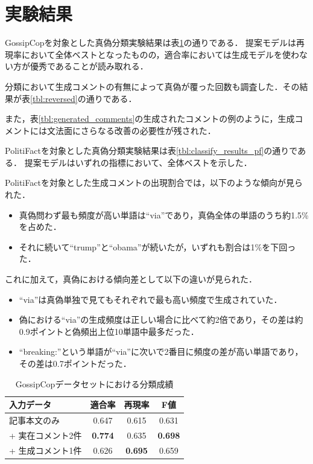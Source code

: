 \section{実験結果}
\label{sec:result}
GossipCopを対象とした真偽分類実験結果は表\ref{tbl:classify_results}の通りである．
提案モデルは再現率において全体ベストとなったものの，適合率においては生成モデルを使わない方が優秀であることが読み取れる．

分類において生成コメントの有無によって真偽が覆った回数も調査した．その結果が表\ref{tbl:reversed}の通りである．

また，表\ref{tbl:generated_comments}の生成されたコメントの例のように，生成コメントには文法面にさらなる改善の必要性が残された．

PolitiFactを対象とした真偽分類実験結果は表\ref{tbl:classify_results_pf}の通りである．
提案モデルはいずれの指標において、全体ベストを示した．

PolitiFactを対象とした生成コメントの出現割合では，以下のような傾向が見られた．
\begin{itemize}
    \item 真偽問わず最も頻度が高い単語は``via''であり，真偽全体の単語のうち約1.5\%を占めた．
    \item それに続いて``trump''と``obama''が続いたが，いずれも割合は1\%を下回った．
\end{itemize}

これに加えて，真偽における傾向差として以下の違いが見られた．

\begin{itemize}
    \item ``via''は真偽単独で見てもそれぞれで最も高い頻度で生成されていた．
    \item 偽における``via''の生成頻度は正しい場合に比べて約2倍であり，その差は約0.9ポイントと偽頻出上位10単語中最多だった．
    \item ``breaking:''という単語が``via''に次いで2番目に頻度の差が高い単語であり，その差は0.7ポイントだった．
\end{itemize}


\begin{table}
    \renewcommand{\arraystretch}{1.3}
    \caption{GossipCopデータセットにおける分類成績}
    \label{tbl:classify_results}
    \centering
    \begin{tabular}{lccc}
        \hline
        入力データ           & 適合率 & 再現率 & F値 \\ \hline
        記事本文のみ         & 0.647     & 0.615  & 0.631    \\
        + 実在コメント2件  & \textbf{0.774}     & 0.635  & \textbf{0.698}    \\
        + 生成コメント1件 & 0.626     & \textbf{0.695}  & 0.659    \\ \hline
    \end{tabular}
\end{table}

